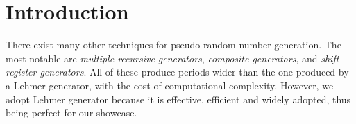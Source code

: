 \section{Introduction}
\label{sec:introduction}

There exist many other techniques for pseudo-random number generation. The most notable are \textit{multiple recursive generators}, \textit{composite generators}, and \textit{shift-register generators}. All of these produce periods wider than the one produced by a Lehmer generator, with the cost of computational complexity.
However, we adopt Lehmer generator because it is effective, efficient and widely adopted, thus being perfect for our showcase.

